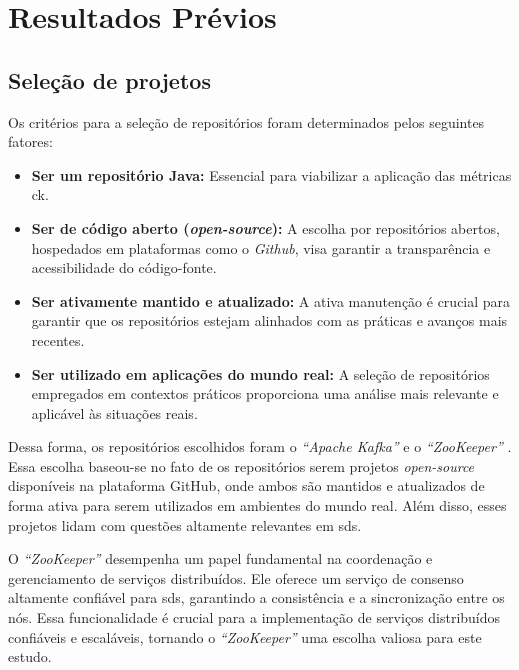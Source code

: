 \chapter{Resultados Prévios}
\label{cap:resultados}

\section{Seleção de projetos}

Os critérios para a seleção de repositórios foram determinados pelos seguintes fatores:

\begin{itemize}
    \item \textbf{Ser um repositório Java:} Essencial para viabilizar a aplicação das métricas \gls{ck}.
    \item \textbf{Ser de código aberto (\textit{open-source}):} A escolha por repositórios abertos, hospedados em plataformas como o \textit{Github}, visa garantir a transparência e acessibilidade do código-fonte.
    \item \textbf{Ser ativamente mantido e atualizado:} A ativa manutenção é crucial para garantir que os repositórios estejam alinhados com as práticas e avanços mais recentes.
    \item \textbf{Ser utilizado em aplicações do mundo real:} A seleção de repositórios empregados em contextos práticos proporciona uma análise mais relevante e aplicável às situações reais.
\end{itemize}

Dessa forma, os repositórios escolhidos foram o \textit{``Apache Kafka''} \cite{KafkaGitHub} e o \textit{``ZooKeeper''} \cite{ZookeeperGitHub}. Essa escolha baseou-se no fato de os repositórios serem projetos \textit{open-source} disponíveis na plataforma GitHub, onde ambos são mantidos e atualizados de forma ativa para serem utilizados em ambientes do mundo real. Além disso, esses projetos lidam com questões altamente relevantes em \gls{sds}.

O \textit{``ZooKeeper''} desempenha um papel fundamental na coordenação e gerenciamento de serviços distribuídos. Ele oferece um serviço de consenso altamente confiável para \gls{sds}, garantindo a consistência e a sincronização entre os nós. Essa funcionalidade é crucial para a implementação de serviços distribuídos confiáveis e escaláveis, tornando o \textit{``ZooKeeper''} uma escolha valiosa para este estudo.

